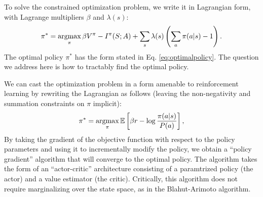\documentclass[11pt]{article}
\newcommand{\argmax}{\operatornamewithlimits{argmax}}
\begin{document}
To solve the constrained optimization problem, we write it in Lagrangian form, with Lagrange multipliers $\beta$ and $\lambda(s)$:
\begin{align}\label{eq:5}
    \pi^\ast = \argmax_{\pi} \beta V^\pi - I^{\pi}(S; A) + \sum_s \lambda(s) \left( \sum_a \pi(a|s) -1 \right).
\end{align}
The optimal policy $\pi^\ast$ has the form stated in Eq. \ref{eq:optimalpolicy}. The question we address here is how to tractably find the optimal policy.

We can cast the optimization problem in a form amenable to reinforcement learning by rewriting the Lagrangian as follows (leaving the non-negativity and summation constraints on $\pi$ implicit):
\begin{align}
\pi^\ast = \argmax_\pi \mathbb{E}\left[\beta r - \log \frac{\pi(a|s)}{P(a)}\right],
\label{eq:objfun}
\end{align}
By taking the gradient of the objective function with respect to the policy parameters and using it to incrementally modify the policy, we obtain a ``policy gradient'' algorithm \citep{sutton18} that will converge to the optimal policy. The algorithm takes the form of an ``actor-critic'' architecture consisting of a paramtrized policy (the actor) and a value estimator (the critic). Critically, this algorithm does not require marginalizing over the state space, as in the Blahut-Arimoto algorithm.
\end{document}
